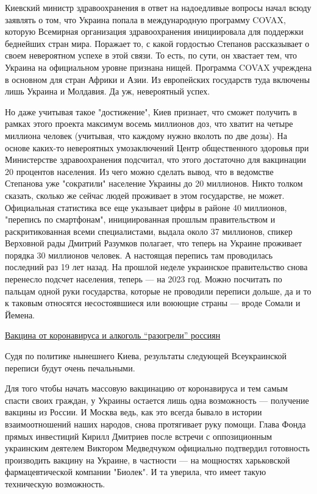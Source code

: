 Киевский министр здравоохранения в ответ на надоедливые вопросы начал всюду
заявлять о том, что Украина попала в международную программу COVAX, которую
Всемирная организация здравоохранения инициировала для поддержки беднейших
стран мира. Поражает то, с какой гордостью Степанов рассказывает о своем
невероятном успехе в этой связи. То есть, по сути, он хвастает тем, что Украина
на официальном уровне признана нищей. Программа COVAX учреждена в основном для
стран Африки и Азии. Из европейских государств туда включены лишь Украина и
Молдавия. Да уж, невероятный успех.

Но даже учитывая такое "достижение", Киев признает, что сможет получить в
рамках этого проекта максимум восемь миллионов доз, что хватит на четыре
миллиона человек (учитывая, что каждому нужно вколоть по две дозы). На основе
каких-то невероятных умозаключений Центр общественного здоровья при
Министерстве здравоохранения подсчитал, что этого достаточно для вакцинации 20
процентов населения. Из чего можно сделать вывод, что в ведомстве Степанова уже
"сократили" население Украины до 20 миллионов. Никто толком сказать, сколько же
сейчас людей проживает в этом государстве, не может. Официальная статистика все
еще указывает цифры в районе 40 миллионов, "перепись по смартфонам",
инициированная прошлым правительством и раскритикованная всеми специалистами,
выдала около 37 миллионов, спикер Верховной рады Дмитрий Разумков полагает, что
теперь на Украине проживает порядка 30 миллионов человек. А настоящая перепись
там проводилась последний раз 19 лет назад. На прошлой неделе украинское
правительство снова перенесло подсчет населения, теперь — на 2023 год. Можно
посчитать по пальцам одной руки государства, которые не проводили переписи
дольше, да и то к таковым относятся несостоявшиеся или воюющие страны — вроде
Сомали и Йемена.

\href{https://ria.ru/20201212/koronavirus-1588871130.html?in=t}{Вакцина от коронавируса и алкоголь \enquote{разогрели} россиян}

Судя по политике нынешнего Киева, результаты следующей Всеукраинской переписи
будут очень печальными.

Для того чтобы начать массовую вакцинацию от коронавируса и тем самым спасти
своих граждан, у Украины остается лишь одна возможность — получение вакцины из
России. И Москва ведь, как это всегда бывало в истории взаимоотношений наших
народов, снова протягивает руку помощи. Глава Фонда прямых инвестиций Кирилл
Дмитриев после встречи с оппозиционным украинским деятелем Виктором Медведчуком
официально подтвердил готовность производить вакцину на Украине, в частности —
на мощностях харьковской фармацевтической компании "Биолек". И та уверила, что
имеет такую техническую возможность.

